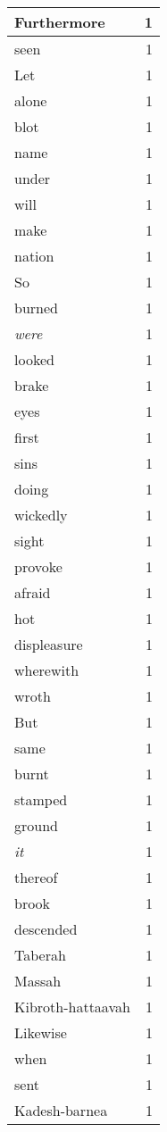 \begin{center}
\begin{longtable}{l|r}
Furthermore & 1 \\ \hline
seen & 1 \\ \hline
Let & 1 \\ \hline
alone & 1 \\ \hline
blot & 1 \\ \hline
name & 1 \\ \hline
under & 1 \\ \hline
will & 1 \\ \hline
make & 1 \\ \hline
nation & 1 \\ \hline
So & 1 \\ \hline
burned & 1 \\ \hline
\emph{were} & 1 \\ \hline
looked & 1 \\ \hline
brake & 1 \\ \hline
eyes & 1 \\ \hline
first & 1 \\ \hline
sins & 1 \\ \hline
doing & 1 \\ \hline
wickedly & 1 \\ \hline
sight & 1 \\ \hline
provoke & 1 \\ \hline
afraid & 1 \\ \hline
hot & 1 \\ \hline
displeasure & 1 \\ \hline
wherewith & 1 \\ \hline
wroth & 1 \\ \hline
But & 1 \\ \hline
same & 1 \\ \hline
burnt & 1 \\ \hline
stamped & 1 \\ \hline
ground & 1 \\ \hline
\emph{it} & 1 \\ \hline
thereof & 1 \\ \hline
brook & 1 \\ \hline
descended & 1 \\ \hline
Taberah & 1 \\ \hline
Massah & 1 \\ \hline
Kibroth-hattaavah & 1 \\ \hline
Likewise & 1 \\ \hline
when & 1 \\ \hline
sent & 1 \\ \hline
Kadesh-barnea & 1 \\ \hline

\end{longtable}
\end{center}
